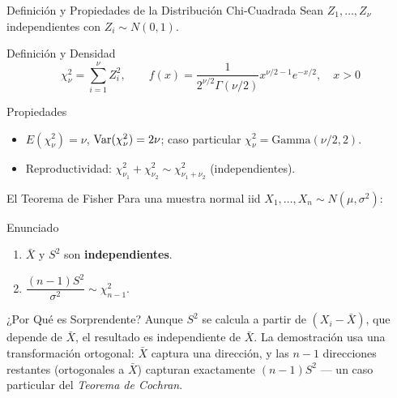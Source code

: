 \documentclass[10pt, aspectratio=169]{beamer}
\begin{document}
\begin{frame}{Definición y Propiedades de la Distribución Chi-Cuadrada}
  \footnotesize
  Sean $Z_1,\ldots,Z_\nu$ independientes con $Z_i\sim N(0,1)$. \pause

  \vspace{0.1cm}
  \begin{block}{Definición y Densidad}
    $$\chi^2_\nu = \sum_{i=1}^\nu Z_i^2, \qquad f(x) = \dfrac{1}{2^{\nu/2}\Gamma(\nu/2)}x^{\nu/2-1}e^{-x/2}, \quad x>0$$
  \end{block}

  \vspace{0.1cm}
  \pause
  \begin{alertblock}{Propiedades}
    \begin{itemize}\itemsep=0.05cm
      \item $E(\chi^2_\nu)=\nu$, $\operatorname{Var}(\chi^2_\nu)=2\nu$; caso particular $\chi^2_\nu=\text{Gamma}(\nu/2,2)$.
      \item Reproductividad: $\chi^2_{\nu_1}+\chi^2_{\nu_2}\sim\chi^2_{\nu_1+\nu_2}$ (independientes).
    \end{itemize}
  \end{alertblock}
\end{frame}

\begin{frame}{El Teorema de Fisher}
  \footnotesize
  Para una muestra normal iid $X_1,\ldots,X_n \sim N(\mu,\sigma^2)$: \pause

  \vspace{0.1cm}
  \begin{block}{Enunciado}
    \begin{enumerate}\itemsep=0.05cm
      \item $\bar{X}$ y $S^2$ son \textbf{independientes}.
      \item $\dfrac{(n-1)S^2}{\sigma^2} \sim \chi^2_{n-1}$.
    \end{enumerate}
  \end{block}

  \vspace{0.1cm}
  \pause
  \begin{alertblock}{¿Por Qué es Sorprendente?}
    Aunque $S^2$ se calcula a partir de $(X_i-\bar{X})$, que depende de $\bar{X}$, el resultado es independiente de $\bar{X}$. La demostración usa una transformación ortogonal: $\bar{X}$ captura una dirección, y las $n-1$ direcciones restantes (ortogonales a $\bar X$) capturan exactamente $(n-1)S^2$ --- un caso particular del \emph{Teorema de Cochran}.
  \end{alertblock}
\end{frame}
\end{document}
